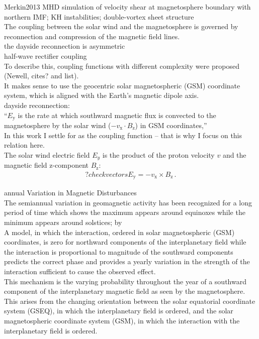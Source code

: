 Merkin2013 MHD simulation of velocity shear at magnetosphere boundary with northern IMF; KH instabilities; double-vortex sheet structure\\



The coupling between the solar wind and the magnetosphere is governed by reconnection and compression of the magnetic field lines.\\

the dayside reconnection is asymmetric\\
half-wave rectifier coupling\\
To describe this, coupling functions with different complexity were proposed (Newell, cites? and list).\\


It makes sense to use the geocentric solar magnetospheric (GSM) coordinate system, which is aligned with the Earth's magnetic dipole axis.\\

dayside reconnection:\\
``$E_\text{y}$ is the rate at which southward magnetic flux is convected to the magnetosphere by the solar wind ($-v_\text{x} \cdot B_\text{z}$) in GSM coordinates,'' \citep{Russell2007}\\

In this work I settle for \vBz{} as the coupling function -- that is why I focus on this relation here.\\

The solar wind electric field $E_y$ is the product of the proton velocity $v$ and the magnetic field z-component $B_\text{z}$:
\begin{align}
	?check vectors  E_\text{y} = -v_\text{x} \times B_\text{z}\,.	\label{eq:coupling_vxBz}
\end{align}


annual Variation in Magnetic Disturbances\\
The semiannual variation in geomagnetic activity has been recognized for a long period of time which shows the maximum appears around equinoxes while the minimum appears around solstices; by \citep{Cortie1912}\\

A model, in which the interaction, ordered in solar magnetospheric (GSM) coordinates, is zero for northward components of the interplanetary field while the interaction is proportional to magnitude of the southward components predicts the correct phase and provides a yearly variation in the strength of the interaction sufficient to cause the observed effect. \citep{Russell1973}\\
This mechanism is the varying probability throughout the year of a southward component of the interplanetary magnetic field as seen by the magnetosphere. This arises from the changing orientation between the solar equatorial coordinate system (GSEQ), in which the interplanetary field is ordered, and the solar magnetospheric coordinate system (GSM), in which the interaction with the interplanetary field is ordered. \citep{Russell1973}\\

